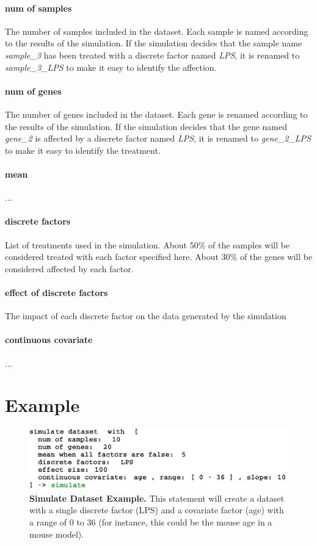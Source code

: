 \paragraph{num of samples}
The number of samples included in the dataset. Each sample is named according to the results of the simulation. If the simulation decides that the sample name \emph{sample\_3 }has been treated with a discrete factor named \emph{LPS}, it is renamed to \emph{sample\_3\_LPS} to make it easy to identify the affection.

\paragraph{num of genes}
The number of genes included in the dataset. Each gene is renamed according to the results  of the simulation. If the simulation decides that the gene named \emph{gene\_2} is affected by a discrete factor named \emph{LPS}, it is renamed to \emph{gene\_2\_LPS} to make it easy to identify the treatment.

\paragraph{mean}
...

\paragraph{discrete factors}
List of treatments used in the simulation. About 50\% of the samples will be considered treated with each factor specified here. About 30\% of the genes will be considered affected by each factor.

\paragraph{effect of discrete factors}
The impact of each discrete factor on the data generated by the simulation

\paragraph{continuous covariate}
...


\section{Example}

\begin{figure}[h!tbp]
  \centering
  \includegraphics[width=\figWidthWide]{figures/SimulateStatementWithParameters.pdf}
\caption[SimulateDataset Example.]{\textbf{Simulate Dataset Example.} This statement will create a dataset with a single discrete factor (LPS) and a covariate factor (age) with a range of 0 to 36 (for instance, this could be the mouse age in a mouse model). }
\label{fig:SimulateDatasetExample}
\end{figure}


